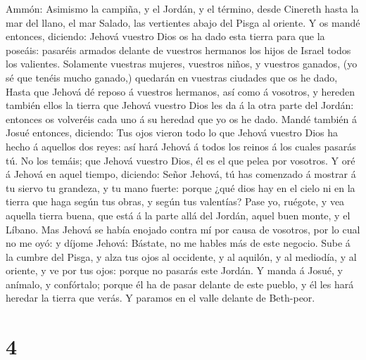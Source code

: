 Ammón:  Asimismo la campiña, y el Jordán, y el término,
desde Cinereth hasta la mar del llano, el mar Salado, las vertientes
abajo del Pisga al oriente.  Y os mandé entonces,
diciendo: Jehová vuestro Dios os ha dado esta tierra para que la
poseáis: pasaréis armados delante de vuestros hermanos los hijos de
Israel todos los valientes.  Solamente vuestras mujeres,
vuestros niños, y vuestros ganados, (yo sé que tenéis mucho ganado,)
quedarán en vuestras ciudades que os he dado,  Hasta que
Jehová dé reposo á vuestros hermanos, así como á vosotros, y hereden
también ellos la tierra que Jehová vuestro Dios les da á la otra parte
del Jordán: entonces os volveréis cada uno á su heredad que yo os he
dado.  Mandé también á Josué entonces, diciendo: Tus ojos
vieron todo lo que Jehová vuestro Dios ha hecho á aquellos dos reyes:
así hará Jehová á todos los reinos á los cuales pasarás tú.
 No los temáis; que Jehová vuestro Dios, él es el que
pelea por vosotros.  Y oré á Jehová en aquel tiempo,
diciendo:  Señor Jehová, tú has comenzado á mostrar á tu
siervo tu grandeza, y tu mano fuerte: porque ¿qué dios hay en el cielo
ni en la tierra que haga según tus obras, y según tus valentías?
 Pase yo, ruégote, y vea aquella tierra buena, que está á
la parte allá del Jordán, aquel buen monte, y el Líbano. 
Mas Jehová se había enojado contra mí por causa de vosotros, por lo cual
no me oyó: y díjome Jehová: Bástate, no me hables más de este negocio.
 Sube á la cumbre del Pisga, y alza tus ojos al
occidente, y al aquilón, y al mediodía, y al oriente, y ve por tus ojos:
porque no pasarás este Jordán.  Y manda á Josué, y
anímalo, y confórtalo; porque él ha de pasar delante de este pueblo, y
él les hará heredar la tierra que verás.  Y paramos en el
valle delante de Beth-peor.

\hypertarget{section-3}{%
\section{4}\label{section-3}}

